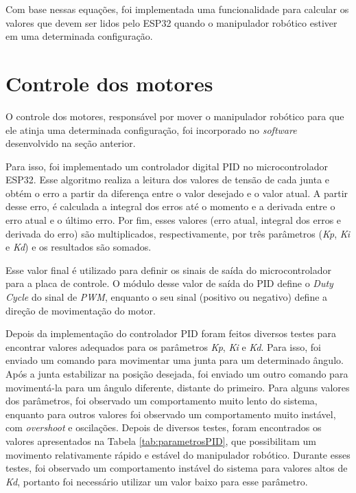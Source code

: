 Com base nessas equações, foi implementada uma funcionalidade para calcular os valores que devem ser lidos pelo ESP32 quando o manipulador robótico estiver em uma determinada configuração.

\section[Controle dos motores]{Controle dos motores}
\label{sec:controleMotores}

O controle dos motores, responsável por mover o manipulador robótico para que ele atinja uma determinada configuração,
foi incorporado no \textit{software} desenvolvido na seção anterior.

Para isso, foi implementado um controlador digital PID no microcontrolador ESP32.
Esse algoritmo realiza a leitura dos valores de tensão de cada junta e obtém o erro a partir da diferença entre o valor desejado e o valor atual.
A partir desse erro, é calculada a integral dos erros até o momento e a derivada entre o erro atual e o último erro.
Por fim, esses valores (erro atual, integral dos erros e derivada do erro) são multiplicados, respectivamente, por três parâmetros (\textit{Kp}, \textit{Ki} e \textit{Kd}) e os resultados são somados.

Esse valor final é utilizado para definir os sinais de saída do microcontrolador para a placa de controle.
O módulo desse valor de saída do PID define o \textit{Duty Cycle} do sinal de \textit{PWM}, enquanto o seu sinal (positivo ou negativo) define a direção de movimentação do motor.

Depois da implementação do controlador PID foram feitos diversos testes para encontrar valores adequados para os parâmetros \textit{Kp}, \textit{Ki} e \textit{Kd}.
Para isso, foi enviado um comando para movimentar uma junta para um determinado ângulo.
Após a junta estabilizar na posição desejada, foi enviado um outro comando para movimentá-la para um ângulo diferente, distante do primeiro.
Para alguns valores dos parâmetros, foi observado um comportamento muito lento do sistema,
enquanto para outros valores foi observado um comportamento muito instável, com \textit{overshoot} e oscilações.
Depois de diversos testes, foram encontrados os valores apresentados na Tabela \ref{tab:parametrosPID},
que possibilitam um movimento relativamente rápido e estável do manipulador robótico.
Durante esses testes, foi observado um comportamento instável do sistema para valores altos de \textit{Kd},
portanto foi necessário utilizar um valor baixo para esse parâmetro.

